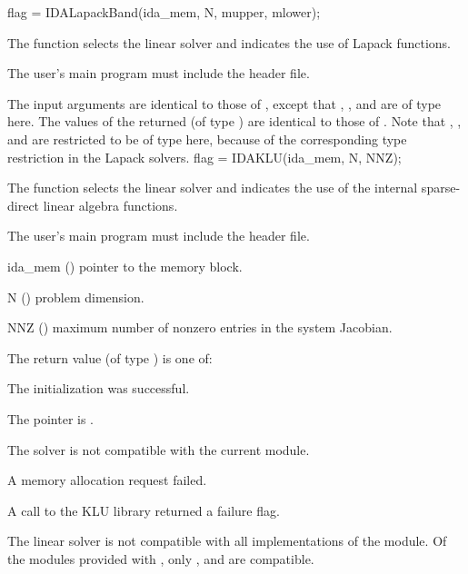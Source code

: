 {
  flag = IDALapackBand(ida\_mem, N, mupper, mlower);
}
{
  The function  selects the {\idaband} linear solver and
  indicates the use of Lapack functions. 

  The user's main program must include the  header file.
}
{
  The input arguments are identical to those of , except
  that , , and  are of type  here.
}
{
  The values of the returned  (of type ) are identical
  to those of .
}
{
  Note that , , and  are restricted to be of type 
  here, because of the corresponding type restriction in the Lapack solvers.
}
{
  flag = IDAKLU(ida\_mem, N, NNZ);
}
{
  The function  selects the {\idaklu} linear solver and indicates
  the use of the internal sparse-direct linear algebra functions.

  The user's main program must include the  header file.
}
{
  \begin{args}
  \item[ida\_mem] ()
    pointer to the {\ida} memory block.
  \item[N] ()
    problem dimension.
  \item[NNZ] ()
    maximum number of nonzero entries in the system Jacobian.
  \end{args}
}
{
  The return value  (of type ) is one of:
  \begin{args}
  \item[\Id{IDASLS\_SUCCESS}] 
    The {\idaklu} initialization was successful.
  \item[\Id{IDASLS\_MEM\_NULL}]
    The  pointer is .
  \item[\Id{IDASLS\_ILL\_INPUT}]
    The {\idaklu} solver is not compatible with the current {\nvector} module.
  \item[\Id{IDASLS\_MEM\_FAIL}]
    A memory allocation request failed.
  \item[\Id{IDASLS\_PACKAGE\_FAIL}]
    A call to the KLU library returned a failure flag.
  \end{args}
}
{
  The {\idaklu} linear solver is not compatible with all
  implementations of the {\nvector} module. 
  Of the {\nvector} modules provided with {\sundials}, only {\nvecs},
  {\nvecopenmp} and {\nvecpthreads} are compatible.
}
